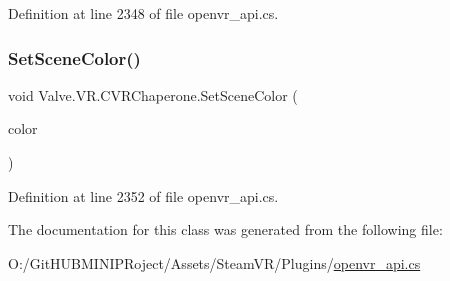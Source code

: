 Definition at line 2348 of file openvr\+\_\+api.\+cs.

\mbox{\label{class_valve_1_1_v_r_1_1_c_v_r_chaperone_ad3bb6c0d59497f0cb7d2d6073b977480}} 
\subsubsection{\texorpdfstring{SetSceneColor()}{SetSceneColor()}}
{\footnotesize\ttfamily void Valve.\+V\+R.\+C\+V\+R\+Chaperone.\+Set\+Scene\+Color (\begin{DoxyParamCaption}\item[{\mbox{\hyperlink{struct_valve_1_1_v_r_1_1_hmd_color__t}{Hmd\+Color\+\_\+t}}}]{color }\end{DoxyParamCaption})}



Definition at line 2352 of file openvr\+\_\+api.\+cs.



The documentation for this class was generated from the following file\+:\begin{DoxyCompactItemize}
\item 
O\+:/\+Git\+H\+U\+B\+M\+I\+N\+I\+P\+Roject/\+Assets/\+Steam\+V\+R/\+Plugins/\mbox{\hyperlink{openvr__api_8cs}{openvr\+\_\+api.\+cs}}\end{DoxyCompactItemize}
